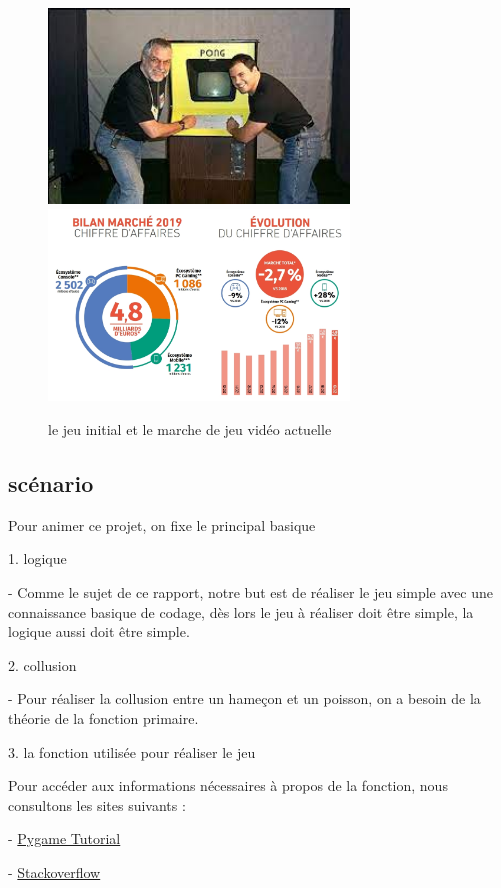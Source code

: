 \documentclass{article}
\begin{document}
  
\vspace{1cm}  
\begin{figure}[h]
    \includegraphics[width=8cm]{image_1.jpeg}\hfill
    \includegraphics[width=8cm]{l'argmentation.jpeg}
    \caption{le jeu initial  et le marche de jeu vidéo actuelle}
\end{figure}
\newpage
\subsection{scénario}
Pour animer ce projet, on fixe le principal basique


1. logique


- Comme le sujet de ce rapport, notre but est de réaliser le jeu simple avec une connaissance basique de codage, dès lors le jeu à réaliser doit être simple, la logique aussi doit être simple.


2. collusion


- Pour réaliser la collusion entre un hameçon et un poisson, on a besoin de la théorie de la fonction primaire.


3. la fonction utilisée pour réaliser le jeu


Pour accéder aux informations nécessaires à propos de la fonction, nous consultons les sites suivants :


  - \href{https://www.pygame.org/docs/ref/rect.html}{Pygame Tutorial}
  
  
  - \href{https://stackoverflow.com}{Stackoverflow}
\end{document}
